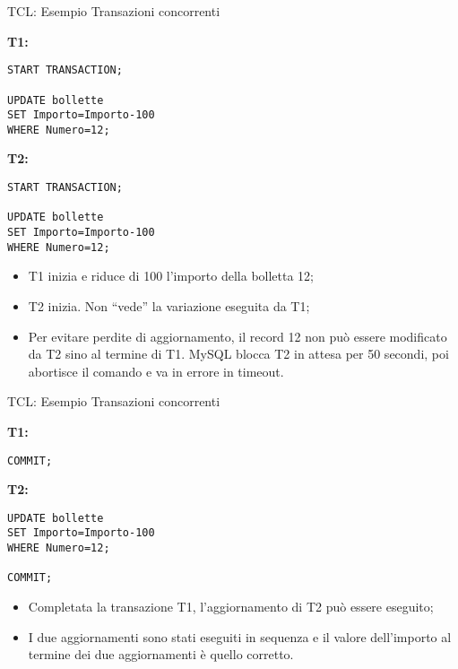 \begin{frame}[fragile]{TCL: Esempio Transazioni concorrenti}
\begin{minipage}[t]{0.48\linewidth}
\textbf{T1:}
\begin{lstlisting}
START TRANSACTION;

UPDATE bollette
SET Importo=Importo-100
WHERE Numero=12;
\end{lstlisting}
\end{minipage}%
\hfill%
\begin{minipage}[t]{0.48\linewidth}
\textbf{T2:}
\begin{lstlisting}
START TRANSACTION;

UPDATE bollette
SET Importo=Importo-100
WHERE Numero=12;
\end{lstlisting}
\end{minipage}
\vspace{.5cm}

\begin{itemize}[<+->]
    \item T1 inizia e riduce di 100 l'importo della bolletta 12;
    \item T2 inizia. Non ``vede'' la variazione eseguita da T1;
    \item Per evitare perdite di aggiornamento, il record 12 non pu\`o essere modificato da T2 sino al termine di T1. MySQL blocca T2 in attesa per 50 secondi, poi abortisce il comando e va in errore in timeout.
\end{itemize}
\end{frame}
%
\begin{frame}[fragile]{TCL: Esempio Transazioni concorrenti}
\begin{minipage}[t]{0.48\linewidth}
\textbf{T1:}
\begin{lstlisting}
COMMIT;
\end{lstlisting}
\end{minipage}%
\hfill%
\begin{minipage}[t]{0.48\linewidth}
\textbf{T2:}
\begin{lstlisting}
UPDATE bollette
SET Importo=Importo-100
WHERE Numero=12;

COMMIT;
\end{lstlisting}
\end{minipage}
\vspace{.5cm}

\begin{itemize}[<+->]
    \item Completata la transazione T1, l'aggiornamento di T2 pu\`o essere eseguito;
    \item I due aggiornamenti sono stati eseguiti in sequenza e il valore dell'importo al termine dei due aggiornamenti \`e quello corretto.
\end{itemize}
\end{frame}
